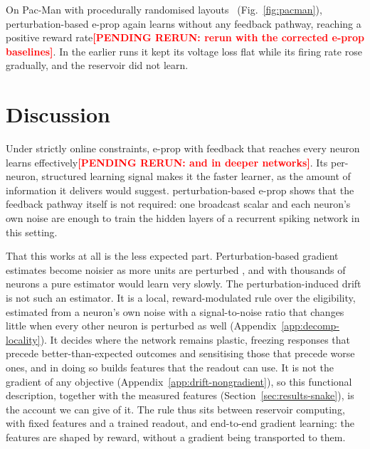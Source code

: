 \documentclass[10pt,twocolumn]{article}
\newcommand{\pending}[1]{\textcolor{red}{\bfseries[PENDING RERUN#1]}}
\newcommand{\method}{perturbation-based e-prop}   %
\begin{document}
On Pac-Man with procedurally randomised layouts~\citep{denero2010pacman}
(Fig.~\ref{fig:pacman}), \method{} again learns without any feedback pathway, reaching
a positive reward rate\pending{: rerun with the corrected e-prop baselines}. In the
earlier runs it kept its voltage loss flat while its firing rate rose gradually, and the
reservoir did not learn.

\section{Discussion}
\label{sec:discussion}

Under strictly online constraints, e-prop with feedback that reaches every
neuron learns effectively\pending{: and in deeper networks}. Its per-neuron, structured
learning signal makes it the faster learner, as the amount of information it delivers
would suggest. \method{} shows that the feedback pathway itself is not required: one
broadcast scalar and each neuron's own noise are enough to train the hidden layers of a
recurrent spiking network in this setting.

That this works at all is the less expected part. Perturbation-based gradient
estimates become noisier as more units are perturbed
\citep{Werfel2005LearningCurves,fiete2006gradient}, and with thousands of neurons a
pure estimator would learn very slowly. The perturbation-induced drift is not such an
estimator. It is a local, reward-modulated rule over the eligibility, estimated from a
neuron's own noise with a signal-to-noise ratio that changes little when every other
neuron is perturbed as well (Appendix~\ref{app:decomp-locality}). It decides where the
network remains plastic, freezing responses that precede better-than-expected outcomes
and sensitising those that precede worse ones, and in doing so builds features that the
readout can use. It is not the gradient of any objective
(Appendix~\ref{app:drift-nongradient}), so this functional description, together with
the measured features (Section~\ref{sec:results-snake}), is the account we can give of
it. The rule thus sits between reservoir computing, with fixed features and
a trained readout, and end-to-end gradient learning: the features are shaped by reward,
without a gradient being transported to them.
\end{document}
